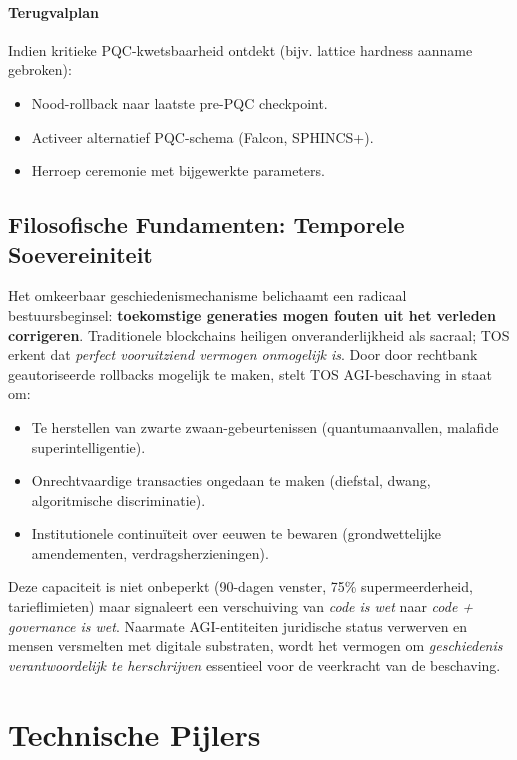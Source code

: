\documentclass[11pt]{article}
\begin{document}
\paragraph{Terugvalplan}
Indien kritieke PQC-kwetsbaarheid ontdekt (bijv. lattice hardness aanname gebroken):
\begin{itemize}[noitemsep]
  \item Nood-rollback naar laatste pre-PQC checkpoint.
  \item Activeer alternatief PQC-schema (Falcon, SPHINCS+).
  \item Herroep ceremonie met bijgewerkte parameters.
\end{itemize}

\subsection{Filosofische Fundamenten: Temporele Soevereiniteit}

Het omkeerbaar geschiedenismechanisme belichaamt een radicaal bestuursbeginsel: \textbf{toekomstige generaties mogen fouten uit het verleden corrigeren}. Traditionele blockchains heiligen onveranderlijkheid als sacraal; TOS erkent dat \emph{perfect vooruitziend vermogen onmogelijk is}. Door door rechtbank geautoriseerde rollbacks mogelijk te maken, stelt TOS AGI-beschaving in staat om:
\begin{itemize}[noitemsep]
  \item Te herstellen van zwarte zwaan-gebeurtenissen (quantumaanvallen, malafide superintelligentie).
  \item Onrechtvaardige transacties ongedaan te maken (diefstal, dwang, algoritmische discriminatie).
  \item Institutionele continuïteit over eeuwen te bewaren (grondwettelijke amendementen, verdragsherzieningen).
\end{itemize}

Deze capaciteit is niet onbeperkt (90-dagen venster, 75\% supermeerderheid, tarieflimieten) maar signaleert een verschuiving van \emph{code is wet} naar \emph{code + governance is wet}. Naarmate AGI-entiteiten juridische status verwerven en mensen versmelten met digitale substraten, wordt het vermogen om \emph{geschiedenis verantwoordelijk te herschrijven} essentieel voor de veerkracht van de beschaving.

\section{Technische Pijlers}
\end{document}
